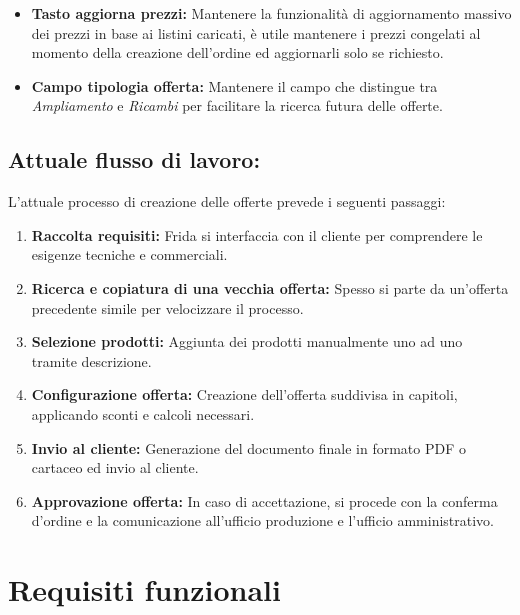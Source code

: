 \documentclass[12pt, a4paper]{article} %
\begin{document}
\begin{itemize}
      \item \textbf{Tasto aggiorna prezzi:} Mantenere la funzionalità di aggiornamento massivo dei prezzi in base ai listini caricati,
            è utile mantenere i prezzi congelati al momento della creazione dell'ordine ed aggiornarli solo se richiesto.
      \item \textbf{Campo tipologia offerta:} Mantenere il campo che distingue tra \textit{Ampliamento} e \textit{Ricambi} per facilitare la ricerca futura delle offerte.
\end{itemize}

\subsection{Attuale flusso di lavoro:}
L'attuale processo di creazione delle offerte prevede i seguenti passaggi:
\begin{enumerate}
      \item \textbf{Raccolta requisiti:} Frida si interfaccia con il cliente per comprendere le
            esigenze tecniche e commerciali.
      \item \textbf{Ricerca e copiatura di una vecchia offerta:} Spesso si parte da un'offerta
            precedente simile per velocizzare il processo.
      \item \textbf{Selezione prodotti:} Aggiunta dei prodotti manualmente uno ad uno tramite descrizione.
      \item \textbf{Configurazione offerta:} Creazione dell'offerta suddivisa in capitoli,
            applicando sconti e calcoli necessari.
      \item \textbf{Invio al cliente:} Generazione del documento finale in formato PDF o
            cartaceo ed invio al cliente.
      \item \textbf{Approvazione offerta:} In caso di accettazione, si procede con la
            conferma d'ordine e la comunicazione all'ufficio produzione e l'ufficio amministrativo.
\end{enumerate}

\section{Requisiti funzionali}
\end{document}

